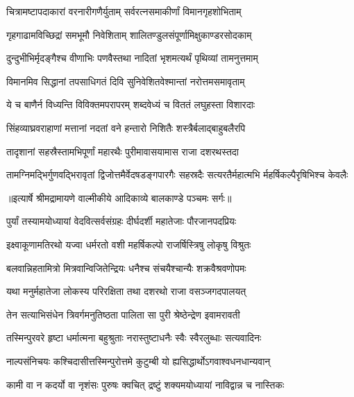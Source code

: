 \twolineshloka
{चित्रामष्टापदाकारां वरनारीगणैर्युताम्}
{सर्वरत्नसमाकीर्णां विमानगृहशोभिताम्} %

\twolineshloka
{गृहगाढामविच्छिद्रां समभूमौ निवेशिताम्}
{शालितण्डुलसंपूर्णामिक्षुकाण्डरसोदकाम्} %

\twolineshloka
{दुन्दुभीभिर्मृदङ्गैश्च वीणाभिः पणवैस्तथा}
{नादितां भृशमत्यर्थं पृथिव्यां तामनुत्तमाम्} %

\twolineshloka
{विमानमिव सिद्धानां तपसाधिगतं दिवि}
{सुनिवेशितवेश्मान्तां नरोत्तमसमावृताम्} %

\twolineshloka
{ये च बाणैर्न विध्यन्ति विविक्तमपरापरम्}
{शब्दवेध्यं च विततं लघुहस्ता विशारदाः} %

\twolineshloka
{सिंहव्याघ्रवराहाणां मत्तानां नदतां वने}
{हन्तारो निशितैः शस्त्रैर्बलाद्बाहुबलैरपि} %

\twolineshloka
{तादृशानां सहस्रैस्तामभिपूर्णां महारथैः}
{पुरीमावासयामास राजा दशरथस्तदा} %

\fourlineindentedshloka
{तामग्निमद्भिर्गुणवद्भिरावृतां}
{ द्विजोत्तमैर्वेदषडङ्गपारगैः}
{सहस्रदैः सत्यरतैर्महात्मभि}
{र्महर्षिकल्पैरृषिभिश्च केवलैः} %


{॥इत्यार्षे श्रीमद्रामायणे वाल्मीकीये आदिकाव्ये बालकाण्डे पञ्चमः सर्गः॥}


\twolineshloka
{पुर्यां तस्यामयोध्यायां वेदवित्सर्वसंग्रहः}
{दीर्घदर्शी महातेजाः पौरजानपदप्रियः} %

\twolineshloka
{इक्ष्वाकूणामतिरथो यज्वा धर्मरतो वशी}
{महर्षिकल्पो राजर्षिस्त्रिषु लोकृषु विश्रुतः} %

\twolineshloka
{बलवान्निहतामित्रो मित्रवान्विजितेन्द्रियः}
{धनैश्च संचयैश्चान्यैः शक्रवैश्रवणोपमः} %

\twolineshloka
{यथा मनुर्महातेजा लोकस्य परिरक्षिता}
{तथा दशरथो राजा वसञ्जगदपालयत्} %

\twolineshloka
{तेन सत्याभिसंधेन त्रिवर्गमनुतिष्ठता}
{पालिता सा पुरी श्रेष्ठेन्द्रेण इवामरावती} %

\twolineshloka
{तस्मिन्पुरवरे हृष्टा धर्मात्मना बहुश्रुताः}
{नरास्तुष्टाधनैः स्वैः स्वैरलुब्धाः सत्यवादिनः} %

\twolineshloka
{नाल्पसंनिचयः कश्चिदासीत्तस्मिन्पुरोत्तमे}
{कुटुम्बी यो ह्यसिद्धार्थोऽगवाश्वधनधान्यवान्} %

\twolineshloka
{कामी वा न कदर्यो वा नृशंसः पुरुषः क्वचित्}
{द्रष्टुं शक्यमयोध्यायां नाविद्वान्न च नास्तिकः} %

